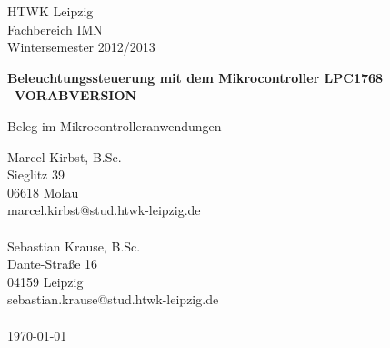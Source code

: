 \documentclass[a4paper,12pt]{scrartcl}
\begin{document}

\begin{titlepage}
\thispagestyle{htwkheader}		
HTWK Leipzig\\
Fachbereich IMN \\
Wintersemester 2012/2013




\begin{center}
\begin{Large}
\vfill {\textsf{\textbf{
Beleuchtungssteuerung mit dem Mikrocontroller LPC1768
\\--VORABVERSION--\\
}}}
\end{Large}
Beleg im Mikrocontrolleranwendungen
\end{center}

\begin{small}
\vfill
Marcel Kirbst, B.Sc.\\
Sieglitz 39 \\
06618 Molau \\
marcel.kirbst@stud.htwk-leipzig.de\\
\\
Sebastian Krause, B.Sc.\\
Dante-Stra\ss{}e 16 \\
04159 Leipzig \\
sebastian.krause@stud.htwk-leipzig.de\\
\\
\today
\end{small}

\end{titlepage}
\addtolength{\voffset}{0cm}
\end{document}
